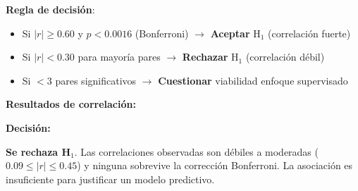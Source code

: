 \documentclass[12pt,letterpaper,twoside]{report}
\begin{document}
\begin{reglabox}
\textbf{Regla de decisión}:

\begin{itemize}[noitemsep]
    \item Si $|r| \geq 0.60$ y $p < 0.0016$ (Bonferroni) $\to$ \textbf{Aceptar} H$_1$ (correlación fuerte)
    \item Si $|r| < 0.30$ para mayoría pares $\to$ \textbf{Rechazar} H$_1$ (correlación débil)
    \item Si $< 3$ pares significativos $\to$ \textbf{Cuestionar} viabilidad enfoque supervisado
\end{itemize}
\end{reglabox}

\begin{calculobox}
\textbf{Resultados de correlación:}

\begin{table}[H]
\centering
\caption{Matriz de Correlación: Biométricos Agregados vs SF-36 ($N=10$)}
\label{tab:correlation_sf36}
\end{table}

\begin{decisionbox}
\textbf{Decisión:}

\textbf{Se rechaza H$_1$}. Las correlaciones observadas son débiles a moderadas ($0.09 \leq |r| \leq 0.45$) y ninguna sobrevive la corrección Bonferroni. La asociación es insuficiente para justificar un modelo predictivo.
\end{decisionbox}


\end{calculobox}
\end{document}

